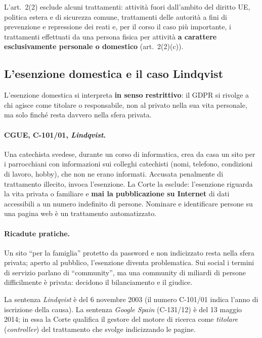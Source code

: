 L'art.~2(2) esclude alcuni trattamenti: attività fuori dall'ambito del diritto UE, politica estera e di
sicurezza comune, trattamenti delle autorità a fini di prevenzione e repressione dei reati e, per il
corso il caso più importante, i trattamenti effettuati da una persona fisica per attività
\textbf{a carattere esclusivamente personale o domestico} (art.~2(2)(c)).

\subsection{L'esenzione domestica e il caso Lindqvist}
\label{sec:gdpr-lindqvist}
L'esenzione domestica si interpreta \textbf{in senso restrittivo}: il GDPR si rivolge a chi agisce come
titolare o responsabile, non al privato nella sua vita personale, ma solo finché resta davvero nella
sfera privata.

\paragraph{CGUE, C-101/01, \emph{Lindqvist}.} Una catechista svedese, durante un corso di informatica,
crea da casa un sito per i parrocchiani con informazioni sui colleghi catechisti (nomi, telefono,
condizioni di lavoro, hobby), che non ne erano informati. Accusata penalmente di trattamento illecito,
invoca l'esenzione. La Corte la esclude: l'esenzione riguarda la vita privata o familiare e
\textbf{mai la pubblicazione su Internet} di dati accessibili a un numero indefinito di persone.
Nominare e identificare persone su una pagina web è un trattamento automatizzato.

\paragraph{Ricadute pratiche.} Un sito ``per la famiglia'' protetto da password e non indicizzato resta
nella sfera privata; aperto al pubblico, l'esenzione diventa problematica. Sui social i termini di
servizio parlano di ``community'', ma una community di miliardi di persone difficilmente è privata:
decidono il bilanciamento e il giudice.

\begin{integrazione}
La sentenza \emph{Lindqvist} è del 6 novembre 2003 (il numero C-101/01 indica l'anno di iscrizione
della causa). La sentenza \emph{Google Spain} (C-131/12) è del 13 maggio 2014; in essa la Corte
qualifica il gestore del motore di ricerca come \emph{titolare} (\emph{controller}) del trattamento che
svolge indicizzando le pagine.
\end{integrazione}


